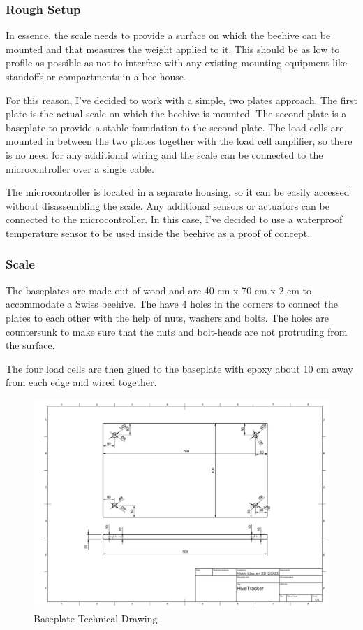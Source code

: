 \subsubsection{Rough Setup}
In essence, the scale needs to provide a surface on which the beehive can be mounted and that measures the weight applied to it. This should be as low to profile as possible as not to interfere with any existing mounting equipment like standoffs or compartments in a bee house.

For this reason, I've decided to work with a simple, two plates approach. The first plate is the actual scale on which the beehive is mounted. The second plate is a baseplate to provide a stable foundation to the second plate. The load cells are mounted in between the two plates together with the load cell amplifier, so there is no need for any additional wiring and the scale can be connected to the microcontroller over a single cable.

The microcontroller is located in a separate housing, so it can be easily accessed without disassembling the scale. Any additional sensors or actuators can be connected to the microcontroller. In this case, I've decided to use a waterproof temperature sensor to be used inside the beehive as a proof of concept.

\subsubsection{Scale}
The baseplates are made out of wood and are 40 cm x 70 cm x 2 cm to accommodate a Swiss beehive. The have 4 holes in the corners to connect the plates to each other with the help of nuts, washers and bolts. The holes are countersunk to make sure that the nuts and bolt-heads are not protruding from the surface.

The four load cells are then glued to the baseplate with epoxy about 10 cm away from each edge and wired together.

\begin{figure}
    \centering
    \includegraphics[angle=90,width=1\textwidth]{figures/hivetracker_baseplate.pdf}
    \caption{Baseplate Technical Drawing}
    \label{fig:baseplate_drawing}
\end{figure}
\newpage


